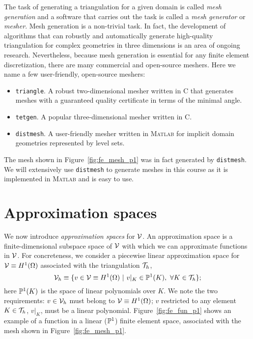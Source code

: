 The task of generating a triangulation for a given domain is called \emph{mesh generation} and a software that carries out the task is called a \emph{mesh generator} or \emph{mesher}.  Mesh generation is a non-trivial task.  In fact, the development of algorithms that can robustly and automatically generate high-quality triangulation for complex geometries in three dimensions is an area of ongoing research.  Nevertheless, because mesh generation is essential for any finite element discretization, there are many commercial and open-source meshers.  Here we name a few user-friendly, open-source meshers:
\begin{itemize}
\item \texttt{triangle}. A robust two-dimensional mesher written in C that generates meshes with a guaranteed quality certificate in terms of the minimal angle.
\item \texttt{tetgen}. A popular three-dimensional mesher written in C.
\item \texttt{distmesh}.  A user-friendly mesher written in \textsc{Matlab} for implicit domain geometries represented by level sets. 
\end{itemize}
The mesh shown in Figure~\ref{fig:fe_mesh_p1} was in fact generated by \texttt{distmesh}.  We will extensively use \texttt{distmesh} to generate meshes in this course as it is implemented in \textsc{Matlab} and is easy to use.


\section{Approximation spaces}
We now introduce \emph{approximation spaces} for $\mathcal{V}$.  An approximation space is a finite-dimensional subspace space of $\mathcal{V}$ with which we can approximate functions in $\mathcal{V}$. For concreteness, we consider a piecewise linear approximation space for $\mathcal{V} \equiv H^1(\Omega)$ associated with the triangulation $\mathcal{T}_h$,
\begin{equation}
  \mathcal{V}_h \equiv \{ v \in \mathcal{V} \equiv H^1(\Omega) \ | \ v|_K \in \mathbb{P}^1(K), \ \forall K \in \mathcal{T}_h \};
  \label{eq:fe_lin_Vh}
\end{equation}
here $\mathbb{P}^1(K)$ is the space of linear polynomials over $K$. We note the two requirements: $v \in \mathcal{V}_h$ must belong to $\mathcal{V} \equiv H^1(\Omega)$;  $v$ restricted to any element $K \in \mathcal{T}_h$, $v|_K$, must be a linear polynomial. Figure~\ref{fig:fe_fun_p1} shows an example of a function in a linear ($\mathbb{P}^1$) finite element space, associated with the mesh shown in Figure~\ref{fig:fe_mesh_p1}.

